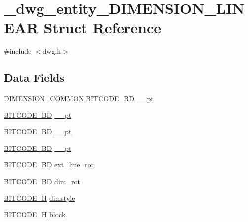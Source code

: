 \hypertarget{struct__dwg__entity__DIMENSION__LINEAR}{\section{\-\_\-dwg\-\_\-entity\-\_\-\-D\-I\-M\-E\-N\-S\-I\-O\-N\-\_\-\-L\-I\-N\-E\-A\-R \-Struct \-Reference}
\label{struct__dwg__entity__DIMENSION__LINEAR}
}


{\ttfamily \#include $<$dwg.\-h$>$}

\subsection*{\-Data \-Fields}
\begin{DoxyCompactItemize}
\item 
\hyperlink{dwg_8h_a334d626d7e4a0a1af39036446dfa82c4}{\-D\-I\-M\-E\-N\-S\-I\-O\-N\-\_\-\-C\-O\-M\-M\-O\-N} \hyperlink{dwg_8h_a1d23a9bc9a02453876b244dc6706f6a6}{\-B\-I\-T\-C\-O\-D\-E\-\_\-R\-D} \hyperlink{struct__dwg__entity__DIMENSION__LINEAR_a3e4ac905cc9e070539ce05c71e295f26}{\-\_\-\_\-pt}
\item 
\hyperlink{dwg_8h_a00698ef1bb072aa0a9360c6fc1c57587}{\-B\-I\-T\-C\-O\-D\-E\-\_\-B\-D} \hyperlink{struct__dwg__entity__DIMENSION__LINEAR_af4c6ced5a7a0a94120a93d4690a3af37}{\-\_\-\_\-pt}
\item 
\hyperlink{dwg_8h_a00698ef1bb072aa0a9360c6fc1c57587}{\-B\-I\-T\-C\-O\-D\-E\-\_\-B\-D} \hyperlink{struct__dwg__entity__DIMENSION__LINEAR_a8b540da24531da67e0ebf21013eacdf9}{\-\_\-\_\-pt}
\item 
\hyperlink{dwg_8h_a00698ef1bb072aa0a9360c6fc1c57587}{\-B\-I\-T\-C\-O\-D\-E\-\_\-B\-D} \hyperlink{struct__dwg__entity__DIMENSION__LINEAR_af4d9ef71ba00fad881d29f9f35df78f9}{\-\_\-\_\-pt}
\item 
\hyperlink{dwg_8h_a3c1e6781466b74ba07785d57da70ed97}{\-B\-I\-T\-C\-O\-D\-E\-\_\-\-B\-D} \hyperlink{struct__dwg__entity__DIMENSION__LINEAR_af7fbdcdd23d540862e6c02eba97fecdb}{ext\-\_\-line\-\_\-rot}
\item 
\hyperlink{dwg_8h_a3c1e6781466b74ba07785d57da70ed97}{\-B\-I\-T\-C\-O\-D\-E\-\_\-\-B\-D} \hyperlink{struct__dwg__entity__DIMENSION__LINEAR_a185ea6e75fb78161d6d69586a49fb193}{dim\-\_\-rot}
\item 
\hyperlink{dwg_8h_a7c700e94e047a97ba8c24bdfe4029dc3}{\-B\-I\-T\-C\-O\-D\-E\-\_\-\-H} \hyperlink{struct__dwg__entity__DIMENSION__LINEAR_af5bc4861c78e225e99296b8e27b51b23}{dimstyle}
\item 
\hyperlink{dwg_8h_a7c700e94e047a97ba8c24bdfe4029dc3}{\-B\-I\-T\-C\-O\-D\-E\-\_\-\-H} \hyperlink{struct__dwg__entity__DIMENSION__LINEAR_ad9b85ee855dd84063955be1cf1f5931c}{block}
\end{DoxyCompactItemize}


